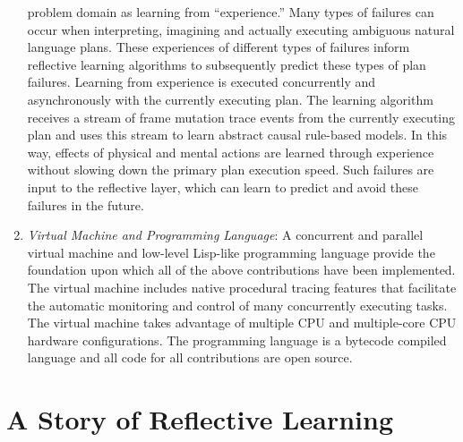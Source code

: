 \begin{enumerate}
  problem domain as learning from ``experience.''  Many types of
  failures can occur when interpreting, imagining and actually
  executing ambiguous natural language plans.  These experiences of
  different types of failures inform reflective learning algorithms to
  subsequently predict these types of plan failures.  Learning from
  experience is executed concurrently and asynchronously with the
  currently executing plan.  The learning algorithm receives a stream
  of frame mutation trace events from the currently executing plan and
  uses this stream to learn abstract causal rule-based models.  In
  this way, effects of physical and mental actions are learned through
  experience without slowing down the primary plan execution speed.
  Such failures are input to the reflective layer, which can learn to
  predict and avoid these failures in the future.
\item \emph{Virtual Machine and Programming Language}: A concurrent
  and parallel virtual machine and low-level Lisp-like programming
  language provide the foundation upon which all of the above
  contributions have been implemented.  The virtual machine includes
  native procedural tracing features that facilitate the automatic
  monitoring and control of many concurrently executing tasks.  The
  virtual machine takes advantage of multiple CPU and multiple-core
  CPU hardware configurations.  The programming language is a bytecode
  compiled language and all code for all contributions are open
  source.
\end{enumerate}

\section{A Story of Reflective Learning}

